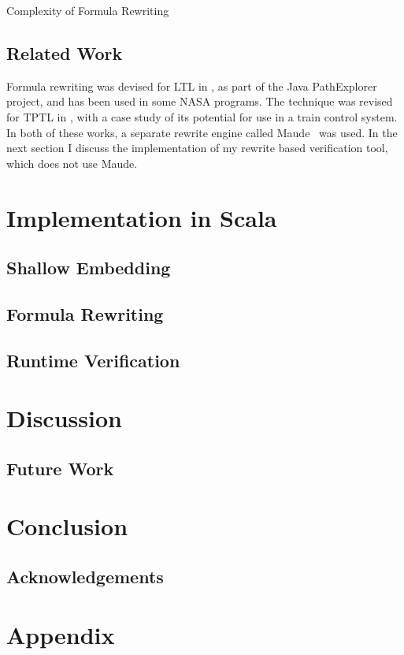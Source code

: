 \documentclass[a4paper]{article}
\begin{document}
\begin{remk}{Complexity of Formula Rewriting}
\end{remk}

\subsection{Related Work}
Formula rewriting was devised for LTL in \textcite{rosu2005rewriting}, as part of the Java PathExplorer project, and has been used in some NASA programs. The technique was revised for TPTL in \textcite{chai2013rewriting}, with a case study of its potential for use in a train control system. In both of these works, a separate rewrite engine called Maude~\autocite{clavel2002maude} was used. In the next section I discuss the implementation of my rewrite based verification tool, which does not use Maude.

\section{Implementation in Scala}
\subsection{Shallow Embedding}
\subsection{Formula Rewriting}
\subsection{Runtime Verification}



\section{Discussion}
\subsection{Future Work}
\section{Conclusion}
\subsection{Acknowledgements}

\nocite{*}
\printbibliography{}
\newpage
\section{Appendix}\label{appendix}
\end{document}
